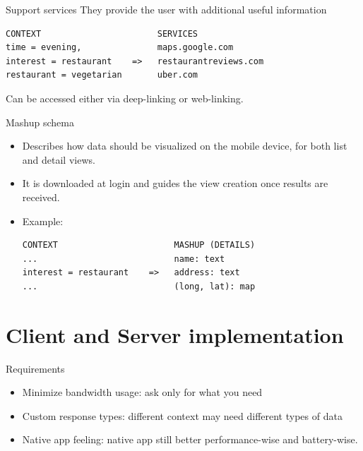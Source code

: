 \documentclass[smaller]{beamer}
\begin{document}
\begin{frame}[fragile,label={sec:orgheadline14}]{Support services}
 They provide the user with \alert{additional useful information}

\begin{verbatim}
CONTEXT                       SERVICES
time = evening,               maps.google.com 
interest = restaurant    =>   restaurantreviews.com
restaurant = vegetarian       uber.com
\end{verbatim}

Can be accessed either via \alert{deep-linking} or \alert{web-linking}.
\end{frame}

\begin{frame}[fragile,label={sec:orgheadline15}]{Mashup schema}
 \begin{itemize}
\item Describes how data should be visualized on the mobile device, for both \alert{list}
  and \alert{detail} views.

\item It is downloaded at login and guides the view creation once results are
received.

\item Example:

\begin{verbatim}
CONTEXT                       MASHUP (DETAILS)
...                           name: text
interest = restaurant    =>   address: text
...                           (long, lat): map
\end{verbatim}
\end{itemize}
\end{frame}


\section{Client and Server implementation}
\label{sec:orgheadline23}
\begin{frame}[label={sec:orgheadline17}]{Requirements}
\begin{itemize}
\item \alert{Minimize bandwidth usage}: ask only for what you need

\item \alert{Custom response types}: different context may need different types of data

\item \alert{Native app feeling}: native app still better performance-wise and battery-wise.
\end{itemize}
\end{frame}
\end{document}

